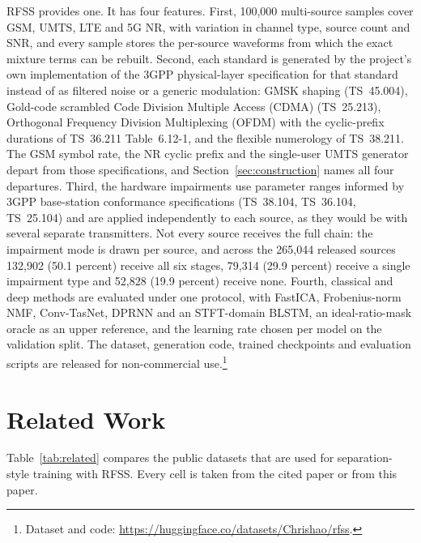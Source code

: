 \documentclass[journal]{IEEEtran}
\begin{document}
RFSS provides one. It has four features. First, 100,000 multi-source samples
cover GSM, UMTS, LTE and 5G NR, with variation in channel type, source count
and SNR, and every sample stores the per-source waveforms from which the exact
mixture terms can be rebuilt. Second, each standard is generated by the
project's own implementation of the 3GPP physical-layer specification for that
standard instead of as filtered noise or a
generic modulation: GMSK shaping (TS~45.004), Gold-code scrambled Code
Division Multiple Access (CDMA) (TS~25.213), Orthogonal Frequency Division
Multiplexing (OFDM) with the cyclic-prefix durations of TS~36.211
Table~6.12-1, and the flexible numerology of TS~38.211. The GSM symbol rate,
the NR cyclic prefix and the single-user UMTS generator depart from those
specifications, and Section~\ref{sec:construction} names all four departures.
Third, the
hardware impairments use parameter ranges informed by 3GPP base-station
conformance specifications (TS~38.104, TS~36.104, TS~25.104) and are applied
independently to each source, as they would be with several separate
transmitters. Not every source receives the full chain: the impairment mode is
drawn per source, and across the 265,044 released sources 132,902 (50.1 percent)
receive all six stages, 79,314 (29.9 percent) receive a single impairment type
and 52,828 (19.9 percent) receive none. Fourth,
classical and deep methods are evaluated under one protocol, with FastICA,
Frobenius-norm NMF, Conv-TasNet, DPRNN and an STFT-domain BLSTM, an
ideal-ratio-mask oracle as an upper reference, and the learning rate chosen per
model on the validation split. The dataset, generation code, trained
checkpoints and evaluation scripts are released for non-commercial
use.\footnote{Dataset and code:
\url{https://huggingface.co/datasets/Chrishao/rfss}.}

\section{Related Work}
\label{sec:related}

Table~\ref{tab:related} compares the public datasets that are used for
separation-style training with RFSS. Every cell is taken from the cited paper
or from this paper.
\end{document}
